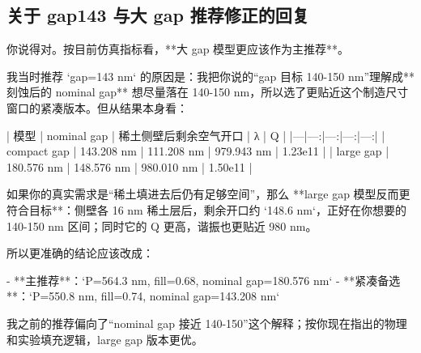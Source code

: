 \documentclass[11pt,a4paper]{ctexart}
\begin{document}
\subsection{关于 gap143 与大 gap 推荐修正的回复}
\begin{ExactText}
你说得对。按目前仿真指标看，**大 gap 模型更应该作为主推荐**。

我当时推荐 `gap=143 nm` 的原因是：我把你说的“gap 目标 140-150 nm”理解成**刻蚀后的 nominal gap** 想尽量落在 140-150 nm，所以选了更贴近这个制造尺寸窗口的紧凑版本。但从结果本身看：

| 模型 | nominal gap | 稀土侧壁后剩余空气开口 | λ | Q |
|---|---:|---:|---:|---:|
| compact gap | 143.208 nm | 111.208 nm | 979.943 nm | 1.23e11 |
| large gap | 180.576 nm | 148.576 nm | 980.010 nm | 1.50e11 |

如果你的真实需求是“稀土填进去后仍有足够空间”，那么 **large gap 模型反而更符合目标**：侧壁各 16 nm 稀土层后，剩余开口约 `148.6 nm`，正好在你想要的 140-150 nm 区间；同时它的 Q 更高，谐振也更贴近 980 nm。

所以更准确的结论应该改成：

- **主推荐**：`P=564.3 nm, fill=0.68, nominal gap=180.576 nm`
- **紧凑备选**：`P=550.8 nm, fill=0.74, nominal gap=143.208 nm`

我之前的推荐偏向了“nominal gap 接近 140-150”这个解释；按你现在指出的物理和实验填充逻辑，large gap 版本更优。
\end{ExactText}
\end{document}
